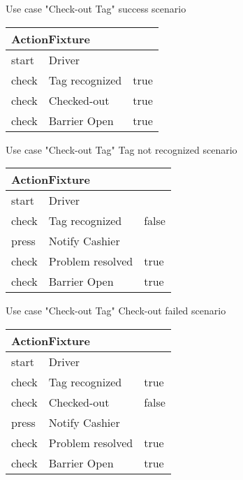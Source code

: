 
\noindent Use case "Check-out Tag" success scenario
\madeby{\mb}{\af}

\vspace{0.4cm}
\begin{tabular}{| p{2cm} | p{5.5cm} | p{5.5cm} |} \hline
\multicolumn{3}{|l|}{ActionFixture} \\ \hline
start & \multicolumn{2}{|l|}{Driver} \\ \hline
check & Tag recognized & true \\ \hline
check & Checked-out & true \\ \hline
check & Barrier Open & true \\ \hline
\end{tabular}
\vspace{0.8cm}

\noindent Use case "Check-out Tag" Tag not recognized scenario
\madeby{\mb}{\af}

\vspace{0.4cm}
\begin{tabular}{| p{2cm} | p{5.5cm} | p{5.5cm} |} \hline
\multicolumn{3}{|l|}{ActionFixture} \\ \hline
start & \multicolumn{2}{|l|}{Driver} \\ \hline
check & Tag recognized & false \\ \hline
press & \multicolumn{2}{|l|}{Notify Cashier} \\ \hline
check & Problem resolved & true \\ \hline
check & Barrier Open & true \\ \hline
\end{tabular}
\vspace{0.8cm}

\noindent Use case "Check-out Tag" Check-out failed scenario
\madeby{\mb}{\af}

\vspace{0.4cm}
\begin{tabular}{| p{2cm} | p{5.5cm} | p{5.5cm} |} \hline
\multicolumn{3}{|l|}{ActionFixture} \\ \hline
start & \multicolumn{2}{|l|}{Driver} \\ \hline
check & Tag recognized & true \\ \hline
check & Checked-out & false \\ \hline
press & \multicolumn{2}{|l|}{Notify Cashier} \\ \hline
check & Problem resolved & true \\ \hline
check & Barrier Open & true \\ \hline
\end{tabular}
\vspace{0.8cm}

